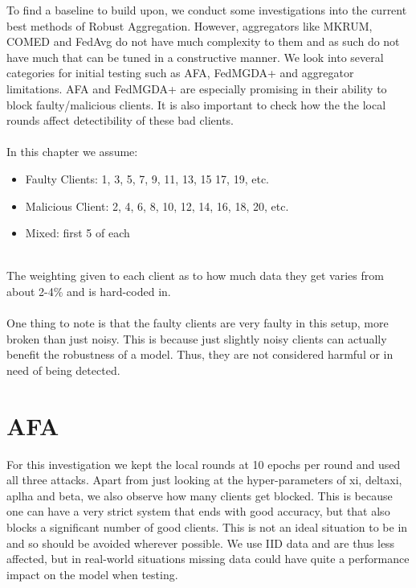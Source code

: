 To find a baseline to build upon, we conduct some investigations into the current best methods of Robust Aggregation.
However, aggregators like MKRUM, COMED and FedAvg do not have much complexity to them and as such do not have much that can be tuned in a constructive manner.
We look into several categories for initial testing such as AFA, FedMGDA+ and aggregator limitations. 
AFA and FedMGDA+ are especially promising in their ability to block faulty/malicious clients. 
It is also important to check how the the local rounds affect detectibility of these bad clients.
\\ \\
In this chapter we assume:
\begin{itemize}
    \item Faulty Clients: 1, 3, 5, 7, 9, 11, 13, 15 17, 19, etc.
    \item Malicious Client: 2, 4, 6, 8, 10, 12, 14, 16, 18, 20, etc.
    \item Mixed: first 5 of each
\end{itemize}
\\
The weighting given to each client as to how much data they get varies from about 2-4\% and is hard-coded in.
\\ \\
One thing to note is that the faulty clients are very faulty in this setup, more broken than just noisy.
This is because just slightly noisy clients can actually benefit the robustness of a model. 
Thus, they are not considered harmful or in need of being detected.

\section{AFA}
For this investigation we kept the local rounds at 10 epochs per round and used all three attacks.
Apart from just looking at the hyper-parameters of xi, deltaxi, aplha and beta, we also observe how many clients get blocked.
This is because one can have a very strict system that ends with good accuracy, but that also blocks a significant number of good clients.
This is not an ideal situation to be in and so should be avoided wherever possible.
We use IID data and are thus less affected, but in real-world situations missing data could have quite a performance impact on the model when testing.

